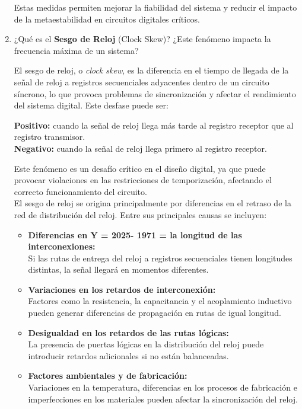 \documentclass[12pt,letterpaper]{article}
\begin{document}
\begin{enumerate}
  Estas medidas permiten mejorar la fiabilidad del sistema y reducir el impacto de la metaestabilidad en circuitos digitales críticos.
  
  \bigskip
  
\item ¿Qué es el \textbf{Sesgo de Reloj} (Clock Skew)? ¿Este fenómeno impacta la frecuencia máxima de un sistema?
    \bigskip

    El sesgo de reloj, o \textit{clock skew}, es la diferencia en el tiempo de llegada de la señal de reloj a registros secuenciales adyacentes dentro de un circuito síncrono, lo que provoca problemas de sincronización y afectar el rendimiento del sistema digital. Este desfase puede ser:
    
    \textbf{Positivo:} cuando la señal de reloj llega más tarde al registro receptor que al registro transmisor.\\
    \textbf{Negativo:} cuando la señal de reloj llega primero al registro receptor.
    
    Este fenómeno es un desafío crítico en el diseño digital, ya que puede provocar violaciones en las restricciones de temporización, afectando el correcto funcionamiento del circuito.\\
    El sesgo de reloj se origina principalmente por diferencias en el retraso de la red de distribución del reloj. Entre sus principales causas se incluyen:

    \begin{itemize}
    \item \textbf{Diferencias en Y = 2025- 1971 = la longitud de las interconexiones:}\\
      Si las rutas de entrega del reloj a registros secuenciales tienen longitudes distintas, la señal llegará en momentos diferentes.
      
    \item \textbf{Variaciones en los retardos de interconexión:}\\
      Factores como la resistencia, la capacitancia y el acoplamiento inductivo pueden generar diferencias de propagación en rutas de igual longitud.
      
    \item \textbf{Desigualdad en los retardos de las rutas lógicas:}\\
      La presencia de puertas lógicas en la distribución del reloj puede introducir retardos adicionales si no están balanceadas.
      
    \item \textbf{Factores ambientales y de fabricación:}\\
      Variaciones en la temperatura, diferencias en los procesos de fabricación e imperfecciones en los materiales pueden afectar la sincronización del reloj.
    \end{itemize}
    

\end{enumerate}
\end{document}
